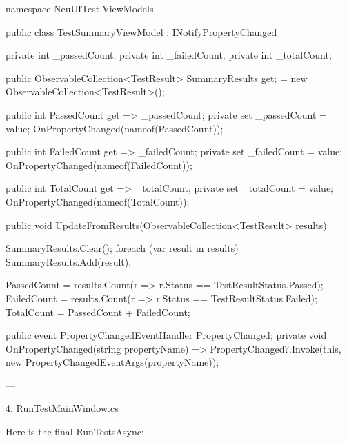 namespace NeuUITest.ViewModels
{
    public class TestSummaryViewModel : INotifyPropertyChanged
    {
        private int _passedCount;
        private int _failedCount;
        private int _totalCount;

        public ObservableCollection<TestResult> SummaryResults { get; }
            = new ObservableCollection<TestResult>();

        public int PassedCount
        {
            get => _passedCount;
            private set { _passedCount = value; OnPropertyChanged(nameof(PassedCount)); }
        }

        public int FailedCount
        {
            get => _failedCount;
            private set { _failedCount = value; OnPropertyChanged(nameof(FailedCount)); }
        }

        public int TotalCount
        {
            get => _totalCount;
            private set { _totalCount = value; OnPropertyChanged(nameof(TotalCount)); }
        }

        public void UpdateFromResults(ObservableCollection<TestResult> results)
        {
            SummaryResults.Clear();
            foreach (var result in results)
                SummaryResults.Add(result);

            PassedCount = results.Count(r => r.Status == TestResultStatus.Passed);
            FailedCount = results.Count(r => r.Status == TestResultStatus.Failed);
            TotalCount = PassedCount + FailedCount;
        }

        public event PropertyChangedEventHandler PropertyChanged;
        private void OnPropertyChanged(string propertyName) =>
            PropertyChanged?.Invoke(this, new PropertyChangedEventArgs(propertyName));
    }
}


---

4. RunTestMainWindow.cs

Here is the final RunTestsAsync:


